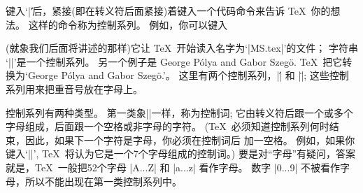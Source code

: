 %
键入`|\|'后，紧接(即在转义符后面紧接)着键入一个代码命令来告诉 \TeX\ 你的想法。%
这样的命令称为{控制系列}。%
例如，你可以键入
\begintt

\endtt
(就象我们后面将讲述的那样)它让 \TeX\ 开始读入名字为`|MS.tex|'的文件；
字符串 `||'是一个控制系列。%
另一个例子是
\begintt
George P\'olya and Gabor Szeg\"o.
\endtt
\TeX\ 把它转换为`George P\'olya and Gabor Szeg\"o.'。
这里有两个控制系列，|\'| 和 |\"|;
这些控制系列用来把重音号放在字母上。

控制系列有两种类型。%
第一类象||一样，称为{控制词};
它由转义符后跟一个或多个{字母}组成，后面跟一个空格或非字母的字符。%
(\TeX\ 必须知道控制系列何时结束，因此，如果下一个字符是字母，你必须在控制词后%
加一空格。%
例如，如果你键入`||', \TeX\ 将认为它是一个7个字母组成的控制词。)
 要是对``字母''有疑问，答案就是，\TeX\ 一般把52个字母 |A...Z| 和 |a...z| 看作字母。%
数字 |0...9| 不被看作字母，所以不能出现在第一类控制系列中。

